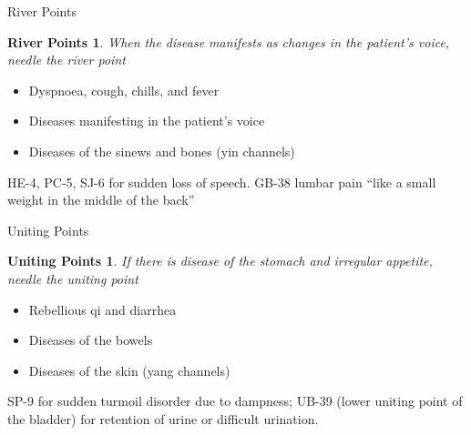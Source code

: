 \begin{frame}{River Points}
\newtheorem{river}{River Points}
\begin{river}
When the disease manifests as changes in the patient's voice, needle the river point
\end{river}

\begin{itemize}
\item Dyspnoea, cough, chills, and fever
\item Diseases manifesting in the patient's voice
\item Diseases of the sinews and bones (yin channels) 
\end{itemize}

\vspace{0.5em}

HE-4, PC-5, SJ-6 for sudden loss of speech. GB-38 lumbar pain ``like a small weight in the middle of the back'' 

\end{frame}

\begin{frame}{Uniting Points}
\newtheorem{unite}{Uniting Points}
\begin{unite}
If there is disease of the stomach and irregular appetite, needle the uniting point
\end{unite}

\begin{itemize}
\item Rebellious qi and diarrhea
\item Diseases of the bowels
\item Diseases of the skin (yang channels) 
\end{itemize}

\vspace{0.5em}

SP-9 for sudden turmoil disorder due to dampness; UB-39 (lower uniting point of the bladder) for retention of urine or difficult urination. 
\end{frame}

